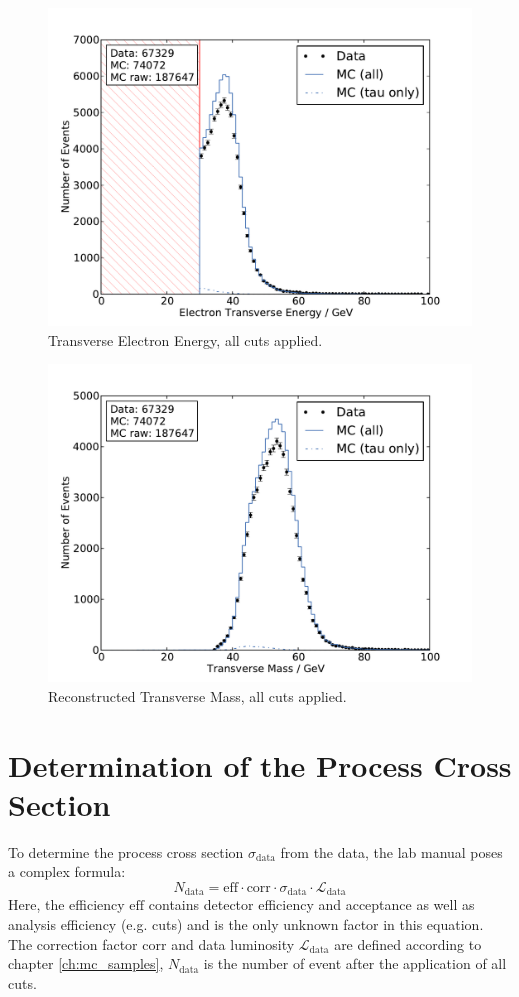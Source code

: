 \documentclass[
	paper=A4,
	parskip=full,
	chapterprefix=true,
	12pt,
	headings=normal,
	bibliography=totoc,
	listof=totoc,
	titlepage=on,
]{scrreprt}
\begin{document}
\begin{figure}%
	\centering
	\includegraphics{allcuts/E_T_el}
	\caption{Transverse Electron Energy, all cuts applied.}
	\label{fig:cuts_Et}
\end{figure}
\begin{figure}
	\centering
	\includegraphics{allcuts/m_T}
	\caption{Reconstructed Transverse Mass, all cuts applied.}
	\label{fig:cuts_Mt}
\end{figure}

\chapter{Determination of the Process Cross Section}
To determine the process cross section $\sigma_\mathrm{data}$ from the data, the lab manual poses a complex formula:
\begin{equation}
	N_\mathrm{data} = \mathrm{eff} \cdot \mathrm{corr} \cdot \sigma_\mathrm{data} \cdot \mathcal{L}_\mathrm{data}
	\label{eq:data_xsec}
\end{equation}
Here, the efficiency $\mathrm{eff}$ contains detector efficiency and acceptance as well as analysis efficiency (e.g. cuts) and is the only unknown factor in this equation. The correction factor $\mathrm{corr}$ and data luminosity $\mathcal{L}_\mathrm{data}$ are defined according to chapter \ref{ch:mc_samples}, $N_\mathrm{data}$ is the number of event after the application of all cuts.
\end{document}

